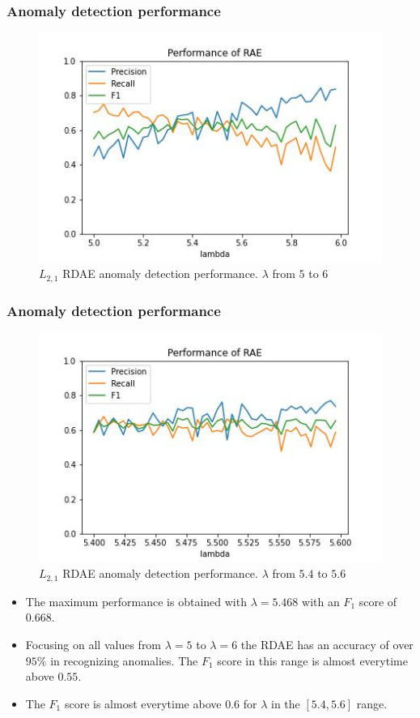 \documentclass{beamer}
\theoremstyle{plain}
\theoremstyle{definition}
\theoremstyle{remark}
\begin{document}
\begin{frame}
	\frametitle{Anomaly detection performance}
	\begin{figure}
		\centering
		\includegraphics[width=0.8\linewidth]{Images/l21_experiment_from_5.0_to_6.0.jpg}
		\caption[]{$L_{2,1}$ RDAE anomaly detection performance. $\lambda$ from $5$ to $6$}
	\end{figure}
\end{frame}

\begin{frame}
	\frametitle{Anomaly detection performance}
	\begin{figure}
		\centering
		\includegraphics[width=0.8\linewidth]{Images/l21_experiment_from_5.4_to_5.6.jpg}
		\caption[]{$L_{2,1}$ RDAE anomaly detection performance. $\lambda$ from $5.4$ to $5.6$}
	\end{figure}
\end{frame}

\begin{frame}
	\begin{itemize}
		\item The maximum performance is obtained with $\lambda=5.468$ with an $F_1$ score of $0.668$.
		\item Focusing on all values from $\lambda=5$ to $\lambda=6$ the RDAE has an accuracy of over $95\%$ in recognizing anomalies. The $F_1$ score in this range is almost everytime above $0.55$.
		\item The $F_1$ score is almost everytime above $0.6$ for $\lambda$ in the $[5.4, 5.6]$ range.
	\end{itemize}
\end{frame}
\end{document}

